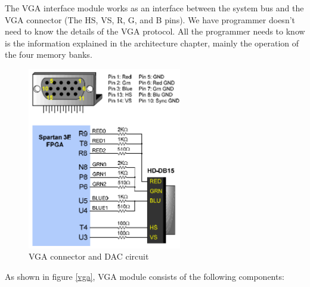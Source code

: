 \documentclass[oneside]{book}
\begin{document}
The VGA interface module works as an interface between the system bus
and the VGA connector (The HS, VS, R, G, and B pins). We have programmer
doesn't need to know the details of the VGA protocol. All the programmer
needs to know is the information explained in the architecture chapter,
mainly the operation of the four memory banks.\\

\begin{figure}[H]
\begin{center}
\includegraphics[width=0.6\textwidth]{vgaport.png}
\end{center}
\caption{VGA connector and DAC circuit}
\label{vgaport}
\end{figure}

As shown in figure \ref{vga}, VGA module consists of the following components:
\end{document}
